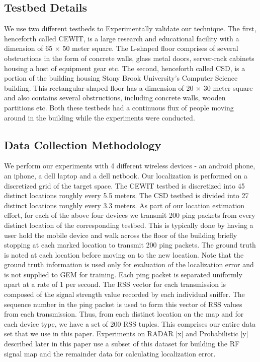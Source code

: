 \documentclass{Localization-PaperWriteupDraft}
\begin{document}
\subsection{Testbed Details}
\label{subsec:testbeddetails}

We use two different testbeds to Experimentally validate our technique. The first, henceforth called CEWIT, is a large research and educational facility with a dimension of 65 $\times$ 50  meter square. The L-shaped floor comprises of several obstructions in the form of concrete walls, glass metal doors, server-rack cabinets housing a host of equipment gear etc. The second, henceforth called CSD, is a portion of the building housing Stony Brook University's Computer Science building. This rectangular-shaped floor has a dimension of 20 $\times$ 30 meter square and also contains several obstructions, including concrete walls, wooden partitions etc. Both these testbeds had a continuous flux of people moving around in the building while the experiments were conducted.

\subsection{Data Collection Methodology}
\label{subsec:datacollectionmethodology}

We perform our experiments with 4 different wireless devices - an android phone, an iphone, a dell laptop and a dell netbook. Our localization is performed on a discretized grid of the target space. The CEWIT testbed is discretized into 45 distinct locations roughly every 5.5 meters. The CSD testbed is divided into 27 distinct locations roughly every 3.3 meters. As part of our location estimation effort,  for each of the above four devices we transmit 200 ping packets from every distinct location of the corresponding testbed. This is typically done by having a user hold the mobile device and walk across the floor of the building briefly stopping at each marked location to transmit 200 ping packets. The ground truth is noted at each location before moving on to the new location. Note that the ground truth information is used only for evaluation of the localization error and is not supplied to GEM for training. Each ping packet is separated uniformly apart at a rate of 1 per second. The RSS vector for each transmission is composed of the signal strength value recorded by each individual sniffer. The sequence number in the ping packet is used to form this vector of RSS values from each transmission. Thus, from each distinct location on the map and for each device type, we have a set of 200 RSS tuples. This comprises our entire data set that we use in this paper. Experiments on RADAR [x] and Probabilistic [y] described later in this paper use a subset of this dataset for building the RF signal map and the remainder data for calculating localization error.
\end{document}
